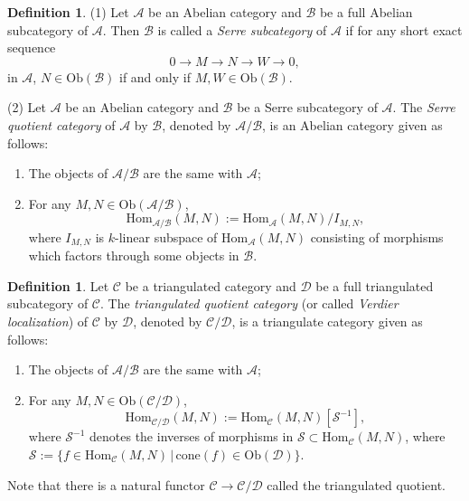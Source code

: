 \documentclass[11pt,reqno]{amsart}
\theoremstyle{definition}
\newtheorem{definition}[theorem]{Definition}
\begin{document}
\begin{definition}\textup{(1)}
Let $\mathcal{A}$ be an Abelian category and $\mathcal{B}$ 
be a full Abelian subcategory of $\mathcal{A}$. 
Then $\mathcal{B}$ is called a {\it Serre subcategory} 
of $\mathcal{A}$ if for any short exact sequence
$$
0 \longrightarrow M \longrightarrow N \longrightarrow W \longrightarrow 0,
$$ in $\mathcal{A}$,
$N \in \mathrm{Ob}(\mathcal{B})$ if and only if 
$M, W \in \mathrm{Ob}(\mathcal{B})$.

\textup{(2)}
Let $\mathcal{A}$ be an Abelian category and $\mathcal{B}$ be a 
Serre subcategory of $\mathcal{A}$. 
The {\it Serre quotient category} of $\mathcal{A}$ by $\mathcal{B}$, denoted by
$\mathcal{A}/\mathcal{B}$,
is an Abelian category given as follows:
\begin{enumerate}
\item[\textup{(i)}] The objects of $\mathcal{A}/\mathcal{B}$ are the same with $\mathcal{A}$;

\item[\textup{(ii)}] For any $M, N \in \mathrm{Ob}(\mathcal{A}/\mathcal{B})$,
$$
\mathrm{Hom}_{\mathcal{A}/\mathcal{B}}(M, N)
:= \mathrm{Hom}_{\mathcal{A}}(M, N)/I_{M, N},
$$
where $I_{M, N}$ is $k$-linear subspace of $\mathrm{Hom}_{\mathcal{A}}(M, N)$ 
consisting of morphisms
which factors through some objects in $\mathcal{B}$.
\end{enumerate}
\end{definition}

\begin{definition}
Let $\mathcal{C}$ be a triangulated category and 
$\mathcal{D}$ be a full triangulated subcategory of $\mathcal{C}$.
The {\it triangulated quotient category} (or called {\it Verdier localization}) 
of $\mathcal{C}$ by $\mathcal{D}$, denoted by $\mathcal{C}/\mathcal{D}$,
is a triangulate category given as follows:
\begin{enumerate}
\item The objects of $\mathcal{A}/\mathcal{B}$ are the same with $\mathcal{A}$;

\item For any $M, N \in \mathrm{Ob}(\mathcal{C}/\mathcal{D})$,
$$
\mathrm{Hom}_{\mathcal{C}/\mathcal{D}}(M, N) := \mathrm{Hom}_{\mathcal{C}}(M, N)[\mathcal{S}^{-1}],
$$
where $\mathcal{S}^{-1}$ denotes the inverses of morphisms in 
$\mathcal{S} \subset \mathrm{Hom}_{\mathcal{C}}(M, N)$, 
where
$\mathcal{S} := \{f \in 
\mathrm{Hom}_{\mathcal{C}}(M, N) \,|\, \mathrm{cone}(f) \in \mathrm{Ob}(\mathcal{D}) \}$.
\end{enumerate}
\end{definition}
Note that there is a natural functor $\mathcal{C} \rightarrow 
\mathcal{C}/\mathcal{D}$ called 
the triangulated quotient. 
\end{document}
